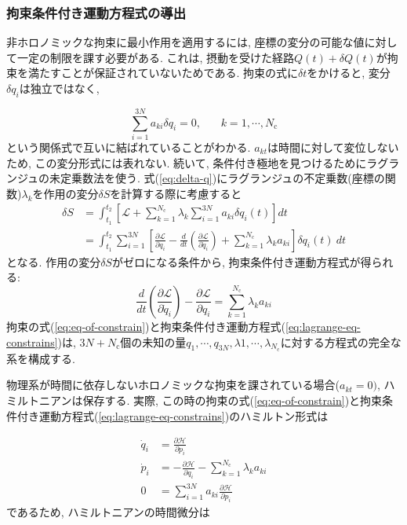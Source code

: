 \subsubsection{拘束条件付き運動方程式の導出}
非ホロノミックな拘束に最小作用を適用するには, 座標の変分の可能な値に対して一定の制限を課す必要がある. これは, 摂動を受けた経路$Q(t) + \delta Q(t)$が拘束を満たすことが保証されていないためである. 
拘束の式に$\delta t$をかけると, 変分$\delta q_{i}$は独立ではなく, 

\begin{equation}
  \sum_{i = 1}^{3N} a_{ki} \delta q_{i} = 0, ~~~~~~~~ k = 1,\cdots, N_{\mathrm{c}}
  \label{eq:delta-q}
\end{equation}
という関係式で互いに結ばれていることがわかる. 
$a_{kt}$は時間に対して変位しないため, この変分形式には表れない. 
続いて, 条件付き極地を見つけるためにラグランジュの未定乗数法を使う. 
式(\ref{eq:delta-q})にラグランジュの不定乗数(座標の関数)$\lambda_{k}$を作用の変分$\delta S$を計算する際に考慮すると
\begin{align}
  \delta S
  &=
  \int_{t_1}^{t_2}
  \left[ \mathcal{L} +
         \sum_{k=1}^{N_{\mathrm{c}}}
         \lambda_{k} \sum_{i = 1}^{3N} a_{ki} \delta q_{i}(t)
  \right] dt
  \\
  &=
  \int_{t_1}^{t_2}
  \sum_{i=1}^{3N}
  \left[
         \frac{\partial \mathcal{L}}{\partial q_{i}}
       - \frac{d}{dt} \left( \frac{\partial \mathcal{L}}{\partial \dot{q}_{i}}\right)
       + \sum_{k=1}^{N_{\mathrm{c}}} \lambda_{k} a_{ki}
  \right] \delta q_{i}(t) ~dt
\end{align}
となる. 作用の変分$\delta S$がゼロになる条件から, 拘束条件付き運動方程式が得られる:
\begin{equation}
  \frac{d}{dt} \left( \frac{\partial \mathcal{L}}{\partial \dot{q}_{i}}\right)
 -\frac{\partial \mathcal{L}}{\partial q_{i}}
 =
 \sum_{k=1}^{N_{\mathrm{c}}} \lambda_{k} a_{ki}
\label{eq:lagrange-eq-constrains}
\end{equation}
拘束の式(\ref{eq:eq-of-constrain})と拘束条件付き運動方程式(\ref{eq:lagrange-eq-constrains})は, $3N+N_{\mathrm{c}}$個の未知の量$q_{1},\cdots,q_{3N}, \lambda{1}, \cdots, \lambda_{N_{\mathrm{c}}}$に対する方程式の完全な系を構成する. 

物理系が時間に依存しないホロノミックな拘束を課されている場合($a_{kt} = 0)$, ハミルトニアンは保存する. 実際, この時の拘束の式(\ref{eq:eq-of-constrain})と拘束条件付き運動方程式(\ref{eq:lagrange-eq-constrains})のハミルトン形式は

\begin{align}
  \dot{q}_{i} &=  \frac{\partial \mathcal{H}}{\partial p_{i}}
  \\
  \dot{p}_{i} &= -\frac{\partial \mathcal{H}}{\partial q_{i}}
                 -\sum_{k=1}^{N_{\mathrm{c}}} \lambda_{k} a_{ki}
  \\
  0 &= \sum_{i=1}^{3N} a_{ki} \frac{\partial \mathcal{H}}{\partial p_{i}}
\end{align}
であるため, ハミルトニアンの時間微分は

